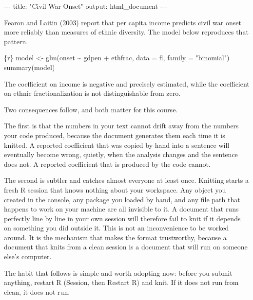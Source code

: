 \documentclass[
  a4paper,
]{scrbook}
\newenvironment{Shaded}{\begin{snugshade}}{\end{snugshade}}
\newcommand{\AnnotationTok}[1]{\textcolor[rgb]{0.37,0.37,0.37}{#1}}
\newcommand{\AttributeTok}[1]{\textcolor[rgb]{0.40,0.45,0.13}{#1}}
\newcommand{\CommentTok}[1]{\textcolor[rgb]{0.37,0.37,0.37}{#1}}
\newcommand{\FunctionTok}[1]{\textcolor[rgb]{0.28,0.35,0.67}{#1}}
\newcommand{\InformationTok}[1]{\textcolor[rgb]{0.37,0.37,0.37}{#1}}
\newcommand{\NormalTok}[1]{\textcolor[rgb]{0.00,0.23,0.31}{#1}}
\newcommand{\OtherTok}[1]{\textcolor[rgb]{0.00,0.23,0.31}{#1}}
\newcommand{\SpecialCharTok}[1]{\textcolor[rgb]{0.37,0.37,0.37}{#1}}
\newcommand{\StringTok}[1]{\textcolor[rgb]{0.13,0.47,0.30}{#1}}
\begin{document}
\begin{Shaded}
\begin{Highlighting}[]
\CommentTok{{-}{-}{-}}
\AnnotationTok{title:}\CommentTok{ "Civil War Onset"}
\AnnotationTok{output:}\CommentTok{ html\_document}
\CommentTok{{-}{-}{-}}

\NormalTok{Fearon and Laitin (2003) report that per capita income predicts}
\NormalTok{civil war onset more reliably than measures of ethnic diversity.}
\NormalTok{The model below reproduces that pattern.}

\InformationTok{\textasciigrave{}\textasciigrave{}\textasciigrave{}\{r\}}
\NormalTok{model }\OtherTok{\textless{}{-}} \FunctionTok{glm}\NormalTok{(onset }\SpecialCharTok{\textasciitilde{}}\NormalTok{ gdpen }\SpecialCharTok{+}\NormalTok{ ethfrac, }\AttributeTok{data =}\NormalTok{ fl, }\AttributeTok{family =} \StringTok{"binomial"}\NormalTok{)}
\FunctionTok{summary}\NormalTok{(model)}
\InformationTok{\textasciigrave{}\textasciigrave{}\textasciigrave{}}

\NormalTok{The coefficient on income is negative and precisely estimated,}
\NormalTok{while the coefficient on ethnic fractionalization is not}
\NormalTok{distinguishable from zero.}
\end{Highlighting}
\end{Shaded}

Two consequences follow, and both matter for this course.

The first is that the numbers in your text cannot drift away from the
numbers your code produced, because the document generates them each
time it is knitted. A reported coefficient that was copied by hand into
a sentence will eventually become wrong, quietly, when the analysis
changes and the sentence does not. A reported coefficient that is
produced by the code cannot.

The second is subtler and catches almost everyone at least once.
Knitting starts a fresh R session that knows nothing about your
workspace. Any object you created in the console, any package you loaded
by hand, and any file path that happens to work on your machine are all
invisible to it. A document that runs perfectly line by line in your own
session will therefore fail to knit if it depends on something you did
outside it. This is not an inconvenience to be worked around. It is the
mechanism that makes the format trustworthy, because a document that
knits from a clean session is a document that will run on someone else's
computer.

The habit that follows is simple and worth adopting now: before you
submit anything, restart R (Session, then Restart R) and knit. If it
does not run from clean, it does not run.
\end{document}
